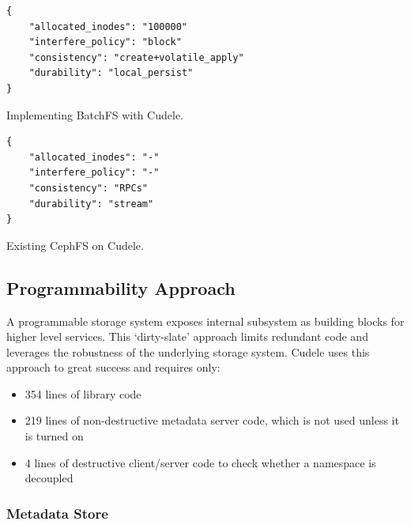 \begin{listing}
\begin{verbatim}
{     
    "allocated_inodes": "100000"
    "interfere_policy": "block"
    "consistency": "create+volatile_apply"
    "durability": "local_persist"
}
\end{verbatim}
\caption{Implementing BatchFS with Cudele.}
\label{src:batchfs}
\end{listing}

\begin{listing}
\begin{verbatim}
{     
    "allocated_inodes": "-"
    "interfere_policy": "-"
    "consistency": "RPCs"
    "durability": "stream"
}
\end{verbatim}
\caption{Existing CephFS on Cudele.}
\label{src:batchfs}
\end{listing}

\subsection{Programmability Approach}

A programmable storage system exposes internal subsystem as building blocks for
higher level services. This `dirty-slate' approach limits redundant code and
leverages the robustness of the underlying storage system. Cudele uses this
approach to great success and requires only:

\begin{itemize}

  \item 354 lines of library code

  \item 219 lines of non-destructive metadata server code, which is not used
  unless it is turned on

  \item 4 lines of destructive client/server code to check whether a namespace
  is decoupled

\end{itemize}

\subsubsection{Metadata Store}

